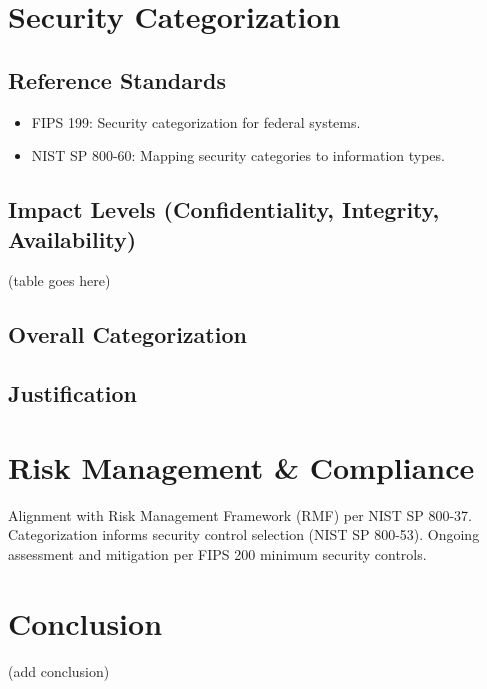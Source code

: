 \documentclass{article}
\begin{document}
\section{Security Categorization}

\subsection{Reference Standards}
\begin{itemize}
    \item FIPS 199: Security categorization for federal systems.
    \item NIST SP 800-60: Mapping security categories to information types.
\end{itemize}

\subsection{Impact Levels (Confidentiality, Integrity, Availability)}
\par (table goes here)
% 

\subsection{Overall Categorization}

\subsection{Justification}

\newpage

\section{Risk Management \& Compliance}
\par Alignment with Risk Management Framework (RMF) per NIST SP 800-37. 
Categorization informs security control selection (NIST SP 800-53). 
Ongoing assessment and mitigation per FIPS 200 minimum security controls.

\section{Conclusion}
\par (add conclusion)
\end{document}
